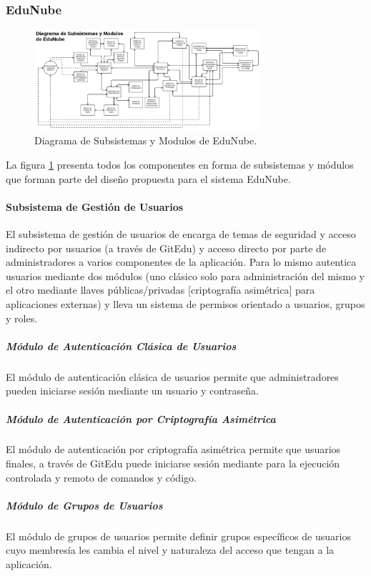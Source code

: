 \subsubsection{EduNube}

\begin{figure}
  \begin{center}
    \includegraphics[width=0.75\textwidth]{Figures/mod_en.png}
  \end{center}
  \caption{Diagrama de Subsistemas y Modulos de EduNube.}
  \label{mod_en}
\end{figure}

La figura \ref{mod_en} presenta todos los componentes en forma de subsistemas y módulos que forman parte del diseño propuesta para el sistema EduNube.

\paragraph{Subsistema de Gestión de Usuarios}
El subsistema de gestión de usuarios de encarga de temas de seguridad y acceso indirecto por usuarios (a través de GitEdu) y acceso directo por parte de administradores a varios componentes de la aplicación. Para lo mismo autentica usuarios mediante dos módulos (uno clásico solo para administración del mismo y el otro mediante llaves públicas/privadas [criptografía asimétrica] para aplicaciones externas) y lleva un sistema de permisos orientado a usuarios, grupos y roles.

\subparagraph{Módulo de Autenticación Clásica de Usuarios}
El módulo de autenticación clásica de usuarios permite que administradores pueden iniciarse sesión mediante un usuario y contraseña.

\subparagraph{Módulo de Autenticación por Criptografía Asimétrica}
El módulo de autenticación por criptografía asimétrica permite que usuarios finales, a través de GitEdu puede iniciarse sesión mediante para la ejecución controlada y remoto de comandos y código.

\subparagraph{Módulo de Grupos de Usuarios}
El módulo de grupos de usuarios permite definir grupos específicos de usuarios cuyo membresía les cambia el nivel y naturaleza del acceso que tengan a la aplicación.

